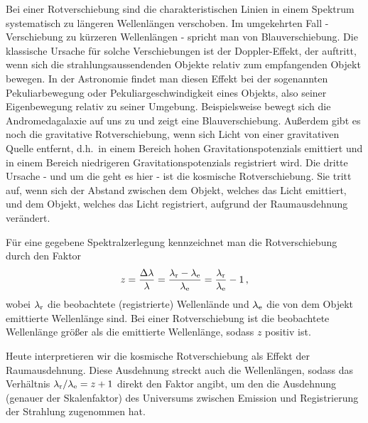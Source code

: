 Bei einer Rotverschiebung 
sind die charakteristischen Linien in einem Spektrum
systematisch zu l\"angeren Wellenl\"angen verschoben. Im umgekehrten Fall - Verschiebung zu
k\"urzeren Wellenl\"angen - spricht man von Blauverschiebung. Die klassische Ursache f\"ur solche
Verschiebungen ist der Doppler-Effekt, der auftritt, wenn sich die strahlungsaussendenden Objekte
relativ zum empfangenden Objekt bewegen. In der Astronomie findet man diesen Effekt bei der
sogenannten Pekuliarbewegung 
oder Pekuliargeschwindigkeit eines Objekts, also seiner Eigenbewegung
relativ zu seiner Umgebung. Beispielsweise bewegt sich die Andromedagalaxie auf uns zu und zeigt
eine Blauverschiebung. Au\ss erdem gibt es noch
die gravitative Rotverschiebung, wenn sich Licht von einer gravitativen Quelle entfernt, d.h.\ in einem
Bereich hohen Gravitationspotenzials emittiert und in einem Bereich niedrigeren Gravitationspotenzials 
registriert wird. Die dritte Ursache - und um die geht es hier - ist die kosmische Rotverschiebung. Sie 
tritt auf, wenn sich der Abstand zwischen dem Objekt, welches das Licht emittiert, und dem Objekt, welches
das Licht registriert, aufgrund der Raumausdehnung ver\"andert.  

F\"ur eine gegebene Spektralzerlegung kennzeichnet 
man die Rotverschiebung durch den Faktor
\begin{equation}
                z = \frac{\Delta \lambda}{\lambda} = \frac{\lambda_{\rm r} - \lambda_{\rm e}}{\lambda_{\rm e}}
                   = \frac{\lambda_{\rm r}}{\lambda_{\rm e}} - 1 \, ,
\end{equation}
wobei $\lambda_{\rm r}$ die beobachtete (registrierte) Wellenl\"ande und $\lambda_{\rm e}$ die von dem Objekt 
emittierte Wellenl\"ange sind. Bei einer Rotverschiebung ist die beobachtete Wellenl\"ange gr\"o\ss er
als die emittierte Wellenl\"ange, sodass $z$ positiv ist. 

Heute interpretieren wir die kosmische Rotverschiebung als Effekt der Raumausdehnung. Diese Ausdehnung
streckt auch die Wellenl\"angen, sodass das Verh\"altnis $\lambda_{\rm r}/\lambda_{\rm e}= z+1$ 
direkt den Faktor angibt, um den die Ausdehnung (genauer der Skalenfaktor) des Universums zwischen
Emission und Registrierung der Strahlung zugenommen hat.

